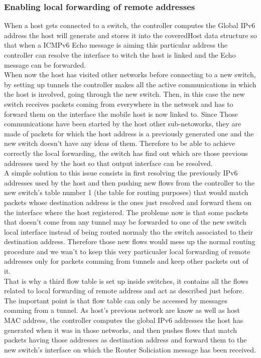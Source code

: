 \documentclass{article}
\begin{document}
\subsubsection{Enabling local forwarding of remote addresses}
When a host gets connected to a switch, the controller computes the
Global IPv6 address the host will generate and stores it into the
coveredHost data structure so that when a ICMPv6 Echo message is
aiming this particular address the controller can resolve the
interface to witch the host is linked and the Echo message can be
forwarded.\\ 
\newline
When now the host has visited other networks before connecting to a
new switch, by setting up tunnels the controller makes all the active
communications in which the host is involved, going through the new
switch. Then, in this case the new switch receives packets coming from
everywhere in the network and has to forward them on the interface the
mobile host is now linked to. Since Those communications have been
started by the host other sub-netoworks, they are made of packets for
which the host address is a previously generated one and the new
switch doesn't have any ideas of them. Therefore to be able to achieve
correctly the local forwarding, the switch has find out which are
those previous addresses used by the host so that output interface can
be resolved.\\
\newline
A simple solution to this issue consists in first resolving the
previously IPv6 addresses used by the host and then pushing new flows
from the controller to the new switch's table number 1 (the table for
routing purposes) that would match packets whose destination address
is the ones just resolved and forward them on the interface where the
host registered. The probleme now is that some packets that doesn't
come from any tunnel may be forwarded to one of the new switch local
interface instead of being routed normaly tho the switch associated to
their destination address. Therefore those new flows would mess up the
normal routing procedure and we wan't to keep this very particualer
local forwarding of remote addresses only for packets comming from
tunnels and keep other packets out of it.\\
\newline
That is why a third flow table is set up inside switches, it contains
all the flows related to local forwarding of remote address and act as
described just before. The important point is that flow table can only
be accessed by messages comming from a tunnel. As host's previous
network are know as well as host MAC address, the controller computes
the global IPv6 addresses the host has generated when it was in those
networks, and then pushes flows that match packets having those addresses
as destination address and forward them to the new switch's interface
on which the Router Soliciation message has been received.
\end{document}
